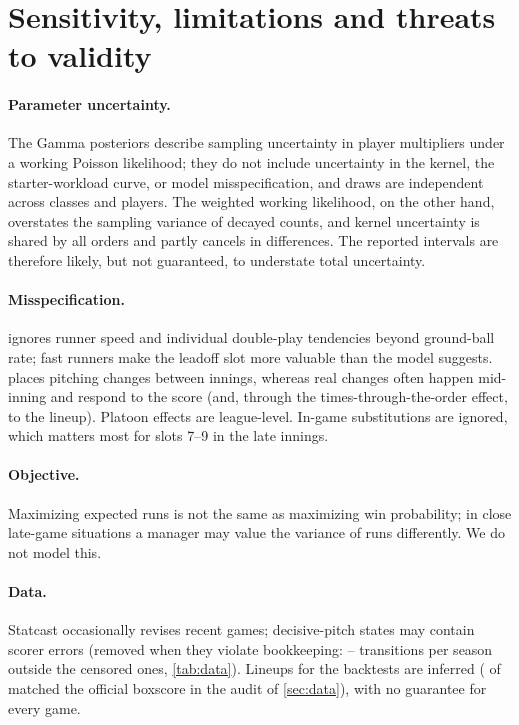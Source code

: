 \documentclass[11pt]{article}
\theoremstyle{definition}
\theoremstyle{remark}
\begin{document}
\section{Sensitivity, limitations and threats to validity}\label{sec:sensitivity}

\paragraph{Parameter uncertainty.} The Gamma posteriors describe sampling uncertainty in player
multipliers under a working Poisson likelihood; they do not include uncertainty in the kernel,
the starter-workload curve, or model misspecification, and draws are independent across classes
and players. The weighted working likelihood, on the other hand, overstates the sampling
variance of decayed counts, and kernel uncertainty is shared by all orders and partly cancels in
differences. The reported intervals are therefore likely, but not guaranteed, to understate total
uncertainty.

\paragraph{Misspecification.}  ignores runner speed and individual double-play
tendencies beyond ground-ball rate; fast runners make the leadoff slot more valuable than the
model suggests.  places pitching changes between innings, whereas real changes
often happen mid-inning and respond to the score (and, through the times-through-the-order effect,
to the lineup). Platoon effects are league-level. In-game substitutions are ignored, which matters
most for slots 7--9 in the late innings.

\paragraph{Objective.} Maximizing expected runs is not the same as maximizing win probability;
in close late-game situations a manager may value the variance of runs differently. We do not
model this.

\paragraph{Data.} Statcast occasionally revises recent games; decisive-pitch states may contain
scorer errors (removed when they violate bookkeeping: \DataErrMin--\DataErrMax{} transitions per season outside
the censored ones, \cref{tab:data}). Lineups for the
backtests are inferred (\EzeroMatch{} of \EzeroN{} matched the official boxscore in the audit of \cref{sec:data}),
with no guarantee for every game.
\end{document}
